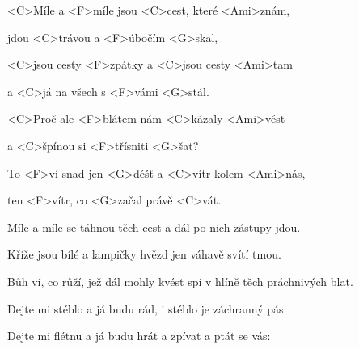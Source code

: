 

\zs
<C>Míle a <F>míle jsou <C>cest, které <Ami>znám,

jdou <C>trávou a <F>úbočím <G>skal,

<C>jsou cesty <F>zpátky a <C>jsou cesty <Ami>tam

a <C>já na všech s <F>vámi <G>stál.

<C>Proč ale <F>blátem nám <C>kázaly <Ami>vést

a <C>špínou si <F>třísniti <G>šat?
\ks

\zr
To <F>ví snad jen <G>déšť a <C>vítr kolem <Ami>nás,

ten <F>vítr, co <G>začal právě <C>vát.
\kr

\zs
Míle a míle se táhnou těch cest a dál po nich zástupy jdou.

Kříže jsou bílé a lampičky hvězd jen váhavě svítí tmou.

Bůh ví, co růží, jež dál mohly kvést spí v hlíně těch práchnivých blat.
\ks

\zr\kr

\zs
Dejte mi stéblo a já budu rád, i stéblo je záchranný pás.

Dejte mi flétnu a já budu hrát a zpívat a ptát se vás:

\ks

\zr\kr

\kp
